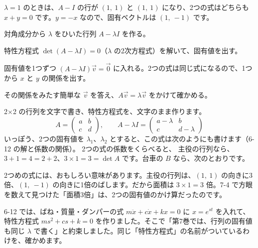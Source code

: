 $\lambda=1$ のときは、$A-I$ の行が $(1,\ 1)$ と $(1,\ 1)$ になり、2つの式はどちらも $x+y=0$ です。$y=-x$ なので、固有ベクトルは $(1,\ -1)$ です。

\begin{taisetsu}
\begin{enumerate}[label={\bkcircled[\bkTT]{\arabic*}}, leftmargin=2.4\zw, itemsep=1pt, topsep=0pt]
\item 対角成分から $\lambda$ をひいた行列 $A-\lambda I$ を作る。
\item 特性方程式 $\det(A-\lambda I)=0$（$\lambda$ の2次方程式）を解いて、固有値を出す。
\item 固有値を1つずつ $(A-\lambda I)\vec v=\vec 0$ に入れる。2つの式は同じ式になるので、1つから $x$ と $y$ の関係を出す。
\item その関係をみたす簡単な $\vec v$ を答え、$A\vec v=\lambda\vec v$ をかけて確かめる。
\end{enumerate}
\end{taisetsu}

2×2 の行列を文字で書き、特性方程式を、文字のまま作ります。
\[ A=\begin{pmatrix}a&b\\c&d\end{pmatrix},\qquad A-\lambda I=\begin{pmatrix}a-\lambda&b\\c&d-\lambda\end{pmatrix} \]
いっぽう、2つの固有値を $\lambda_1$、$\lambda_2$ とすると、この式は次のようにも書けます（6-12 の解と係数の関係）。
2つの式の係数をくらべると、
主役の行列なら、$3+1=4=2+2$、$3\times1=3=\det A$ です。台車の $B$ なら、次のとおりです。

2つめの式には、おもしろい意味があります。主役の行列は、$(1,\ 1)$ の向きに3倍、$(1,\ -1)$ の向きに1倍のばします。だから面積は $3\times1=3$ 倍。7-4 で方眼を数えて見つけた「面積3倍」は、2つの固有値のかけ算だったのです。


\label{bk:7-8:ess}6-12 では、ばね・質量・ダンパーの式 $m\ddot x+c\dot x+kx=0$ に $x=e^{st}$ を入れて、特性方程式 $ms^2+cs+k=0$ を作りました。そこで「第7巻では、行列の固有値も同じ $\lambda$ で書く」と約束しました。同じ「特性方程式」の名前がついているわけを、確かめます。

